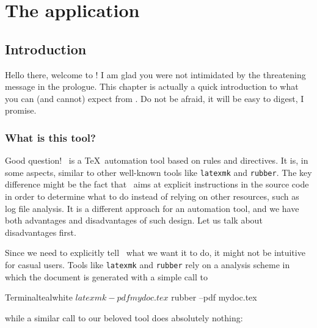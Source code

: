 \documentclass[a4paper,twoside,12pt]{memoir}
\begin{document}
\cleardoublepage

\listoffigures*

\cleardoublepage

\listoftables*

\mainmatter

\part{The application}
\label{part:application}

\chapter{Introduction}
\label{chap:introduction}

Hello there, welcome to \arara! I am glad you were not
intimidated by the threatening message in the prologue.
This chapter is actually a quick introduction to what
you can (and cannot) expect from \arara. Do not be
afraid, it will be easy to digest, I promise.

\section{What is this tool?}
\label{sec:whatisarara}

Good question! \arara\ is a \TeX\ automation tool based
on rules and directives. It is, in some aspects, similar
to other well-known tools like \verb|latexmk| and
\verb|rubber|. The key difference might be the fact that
\arara\ aims at explicit instructions in the source code
in order to determine what to do instead of relying on
other resources, such as log file analysis. It is a
different approach for an automation tool, and we have
both advantages and disadvantages of such design.
Let us talk about disadvantages first.

Since we need to explicitly tell \arara\ what we want it
to do, it might not be intuitive for casual users. Tools
like \verb|latexmk| and \verb|rubber| rely on a analysis
scheme in which the document is generated with a simple
call to

\begin{codebox}{Terminal}{teal}{\icnote}{white}
$ latexmk -pdf mydoc.tex
$ rubber --pdf mydoc.tex
\end{codebox}

\noindent while a similar call to our beloved tool does absolutely nothing:

\end{document}
